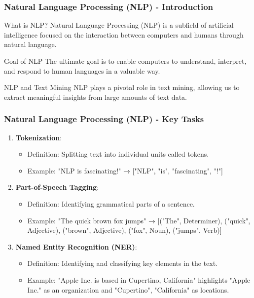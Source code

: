 \documentclass[aspectratio=169]{beamer}
\begin{document}
\begin{frame}[fragile]
    \frametitle{Natural Language Processing (NLP) - Introduction}
    \begin{block}{What is NLP?}
        Natural Language Processing (NLP) is a subfield of artificial intelligence focused on the interaction between computers and humans through natural language.
    \end{block}
    \begin{block}{Goal of NLP}
        The ultimate goal is to enable computers to understand, interpret, and respond to human languages in a valuable way.
    \end{block}
    \begin{block}{NLP and Text Mining}
        NLP plays a pivotal role in text mining, allowing us to extract meaningful insights from large amounts of text data.
    \end{block}
\end{frame}

\begin{frame}[fragile]
    \frametitle{Natural Language Processing (NLP) - Key Tasks}
    \begin{enumerate}
        \item \textbf{Tokenization}:
            \begin{itemize}
                \item Definition: Splitting text into individual units called tokens.
                \item Example: "NLP is fascinating!" → ["NLP", "is", "fascinating", "!"]
            \end{itemize}
        
        \item \textbf{Part-of-Speech Tagging}:
            \begin{itemize}
                \item Definition: Identifying grammatical parts of a sentence.
                \item Example: "The quick brown fox jumps" → [("The", Determiner), ("quick", Adjective), ("brown", Adjective), ("fox", Noun), ("jumps", Verb)]
            \end{itemize}
        
        \item \textbf{Named Entity Recognition (NER)}:
            \begin{itemize}
                \item Definition: Identifying and classifying key elements in the text.
                \item Example: "Apple Inc. is based in Cupertino, California" highlights "Apple Inc." as an organization and "Cupertino", "California" as locations.
            \end{itemize}
    \end{enumerate}
\end{frame}
\end{document}
